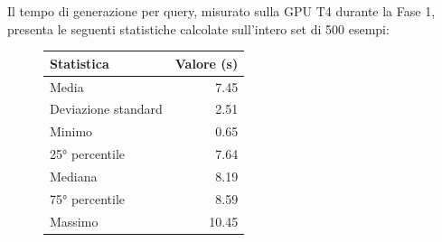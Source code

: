 Il tempo di generazione per query, misurato sulla GPU T4 durante la Fase 1, presenta le seguenti statistiche calcolate sull'intero set di 500 esempi:


\begin{figure}[htbp]
    \centering
    \begin{tabularx}{0.85\textwidth}{X r}
    \toprule
    Statistica & Valore (s) \\
    \midrule
    Media               & 7.45 \\
    Deviazione standard & 2.51 \\
    Minimo              & 0.65 \\
    25° percentile      & 7.64 \\
    Mediana             & 8.19 \\
    75° percentile      & 8.59 \\
    Massimo             & 10.45 \\
    \bottomrule
    \end{tabularx}
    \label{tab:tempo_generazione}
\end{figure}

